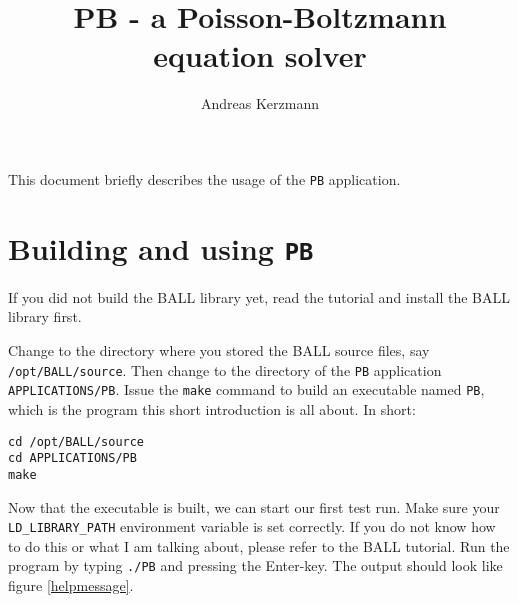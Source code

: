 \documentclass[12pt,twoside,a4paper]{article}
\author{Andreas Kerzmann}
\title{PB - a Poisson-Boltzmann equation solver}
\begin{document}
\maketitle

This document briefly describes the usage of the {\tt PB} application.

\section{Building and using {\tt PB}}

If you did not build the BALL library yet, read the tutorial and
install the BALL library first.

Change to the directory where you stored the BALL source files, say {\tt
/opt/BALL/source}. Then change to the directory of the {\tt PB}
application {\tt APPLICATIONS/PB}. Issue the {\tt make} command to build an
executable named {\tt PB}, which is the program this short introduction is
all about. In short:
\begin{verbatim}
cd /opt/BALL/source
cd APPLICATIONS/PB
make
\end{verbatim}

Now that the executable is built, we can start our first test run. Make sure
your {\tt LD\_LIBRARY\_PATH} environment variable is set correctly. If you
do not know how to do this or what I am talking about, please refer to the
BALL tutorial. Run the program by typing {\tt ./PB} and pressing the
Enter-key. The output should look like figure \ref{helpmessage}.
\end{document}
